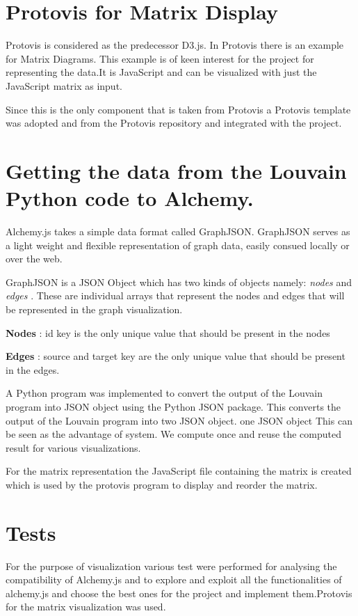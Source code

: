 \section{Protovis for Matrix Display}
Protovis is considered as the predecessor D3.js. In Protovis there is an example for Matrix Diagrams. This example is of keen interest for the project for representing the data.It is JavaScript and can be visualized with just the JavaScript matrix as input.
\par Since this is the only component that is taken from Protovis a Protovis template was adopted and from the Protovis repository and integrated with the project.

\section{Getting the data from the Louvain Python code to Alchemy. }
 Alchemy.js takes a simple data format called GraphJSON. GraphJSON serves as a light weight and flexible representation of graph data, easily consued locally or over the web. 
\par 
GraphJSON is a JSON Object which has two kinds of objects namely: \textit{nodes} and  \textit{edges} . These are individual arrays that represent the nodes and edges that will be represented in the graph visualization. 
\par \textbf{Nodes} : id key is the only unique value that should be present in the nodes
\par \textbf{Edges} : source and target key are the only unique value that should be present in the edges.
\par A Python program was implemented to convert the output of the Louvain program into JSON object using the Python JSON package. This converts the output of the Louvain program into two JSON object. one JSON object 
This can be seen as the advantage of system. We compute once and reuse the computed result for various visualizations.
\par For the matrix representation the JavaScript file containing the matrix is created which is used by the protovis program to display and reorder the matrix.

\section{Tests}
For the purpose of visualization various test were performed for analysing the compatibility of Alchemy.js and to explore and exploit all the functionalities of alchemy.js and choose the best ones for the project and implement them.Protovis for the matrix visualization was used.
